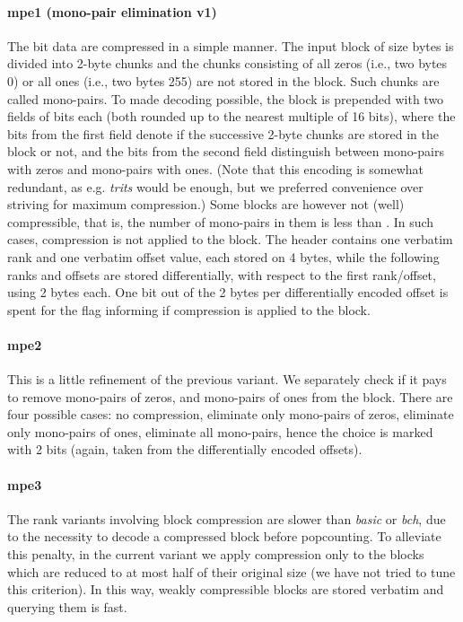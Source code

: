 \documentclass{llncs}
\begin{document}
\paragraph*{\textbf{mpe1 (mono-pair elimination v1)}}
The bit data are compressed in a simple manner. 
The input block of size  bytes is divided into 2-byte chunks 
and the chunks consisting of all zeros (i.e., two bytes 0) 
or all ones (i.e., two bytes 255) are not stored in the block. 
Such chunks are called mono-pairs.
To made decoding possible, the block is prepended with 
two fields of  bits each 
(both rounded up to the nearest multiple of 16 bits), 
where the bits from the first field denote if the successive 2-byte chunks 
are stored in the block or not, 
and the bits from the second field distinguish between mono-pairs with 
zeros and mono-pairs with ones.
(Note that this encoding is somewhat redundant, as e.g.  {\em trits} 
would be enough, but we preferred convenience over 
striving for maximum compression.)
Some blocks are however not (well) compressible, that is, 
the number of mono-pairs in them is less than .
In such cases, compression is not applied to the block.
The header contains one verbatim rank and one verbatim offset value, each 
stored on 4 bytes, 
while the following  ranks and  offsets are stored differentially, 
with respect to the first rank/offset, using 2 bytes each.
One bit out of the 2 bytes per differentially encoded offset is spent for the 
flag informing if compression is applied to the block.


\paragraph*{\textbf{mpe2}}
This is a little refinement of the previous variant. 
We separately check if it pays to remove mono-pairs of zeros, 
and mono-pairs of ones from the block.
There are four possible cases: 
no compression, 
eliminate only mono-pairs of zeros, 
eliminate only mono-pairs of ones, 
eliminate all mono-pairs, 
hence the choice is marked with 2 bits 
(again, taken from the differentially encoded offsets).


\paragraph*{\textbf{mpe3}}
The rank variants involving block compression are slower than 
{\em basic} or {\em bch}, due to the necessity to 
decode a compressed block before popcounting. 
To alleviate this penalty, in the current variant we apply compression 
only to the blocks which are reduced to at most half of their 
original size (we have not tried to tune this criterion).
In this way, weakly compressible blocks are stored verbatim 
and querying them is fast.
\end{document}
